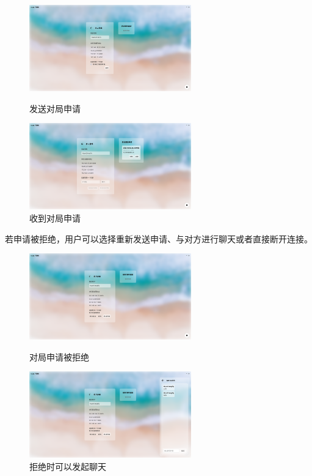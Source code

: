 \documentclass[UTF8]{ctexart}
\begin{document}
\begin{figure}[H]
	\begin{minipage}[t]{0.48\textwidth}
		\centering
		\includegraphics[width=7cm]{Images/Waiting.png}
		\caption{发送对局申请}
	\end{minipage}
	\begin{minipage}[t]{0.48\textwidth}
		\centering
		\includegraphics[width=7cm]{Images/ReceiveRequest.png}
		\caption{收到对局申请}
	\end{minipage}
\end{figure}
若申请被拒绝，用户可以选择重新发送申请、与对方进行聊天或者直接断开连接。\par
\begin{figure}[H]
	\begin{minipage}[t]{0.48\textwidth}
		\centering
		\includegraphics[width=7cm]{Images/Rejected.png}
		\caption{对局申请被拒绝}
	\end{minipage}
	\begin{minipage}[t]{0.48\textwidth}
		\centering
		\includegraphics[width=7cm]{Images/ChatWhenRejected.png}
		\caption{拒绝时可以发起聊天}
	\end{minipage}
\end{figure}
\end{document}
